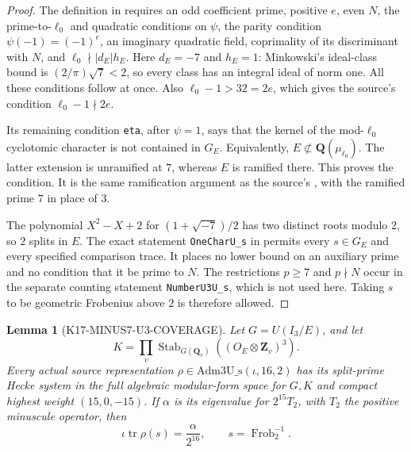 \documentclass[11pt,a4paper]{article}
\newtheorem{lemma}[theorem]{Lemma}
\theoremstyle{definition}
\begin{document}
\begin{proof}
The definition  in
\cite{K17PinnedLeanMirror} requires an odd coefficient prime, positive
\(e\), even \(N\), the prime-to-\(\ell_0\) and quadratic conditions on
\(\psi\), the parity condition \(\psi(-1)=(-1)^e\), an imaginary
quadratic field, coprimality of its discriminant with \(N\), and
\(\ell_0\nmid |d_E|h_E\). Here \(d_E=-7\) and \(h_E=1\): Minkowski's
ideal-class bound is \((2/\pi)\sqrt7<2\), so every class has an integral
ideal of norm one. All these conditions follow at once. Also
\(\ell_0-1>32=2e\), which gives the source's condition
\(\ell_0-1\nmid2e\).

Its remaining condition \texttt{eta}, after \(\psi=1\), says that the
kernel of the mod-\(\ell_0\) cyclotomic character is not contained in
\(G_E\). Equivalently, \(E\not\subset\mathbf Q(\mu_{\ell_0})\).
The latter extension is unramified at \(7\), whereas \(E\) is ramified
there. This proves the condition. It is the same ramification argument
as the source's ,
with the ramified prime \(7\) in place of \(3\).

The polynomial \(X^2-X+2\) for
\((1+\sqrt{-7})/2\) has two distinct roots modulo \(2\), so \(2\)
splits in \(E\). The exact statement \texttt{OneCharU\_s} in
 permits every
\(s\in G_E\) and every specified comparison trace. It places no lower
bound on an auxiliary prime and no condition that it be prime to \(N\).
The restrictions \(p\ge7\) and \(p\nmid N\) occur in the separate
counting statement \texttt{NumberU3U\_s}, which is not used here.
Taking \(s\) to be geometric Frobenius above \(2\) is therefore allowed.
\end{proof}

\begin{lemma}[K17-MINUS7-U3-COVERAGE]\label{lem:minus7-u3-coverage}
Let \(G=U(I_3/E)\), and let
\[
 K=\prod_v\operatorname{Stab}_{G(\mathbf Q_v)}
       ((O_E\otimes\mathbf Z_v)^3).
\]
Every actual source representation
\(\rho\in\mathrm{Adm3U\_s}(\iota,16,2)\) has its split-prime Hecke
system in the full algebraic modular-form space for \(G,K\) and
compact highest weight \((15,0,-15)\).
If \(\alpha\) is its eigenvalue for \(2^{15}T_2\), with \(T_2\) the
positive minuscule operator, then
\[
 \iota\operatorname{tr}\rho(s)=\frac{\alpha}{2^{16}},
 \qquad s=\operatorname{Frob}_2^{-1}.
 \tag{S7.1}
\]
\end{lemma}
\end{document}
